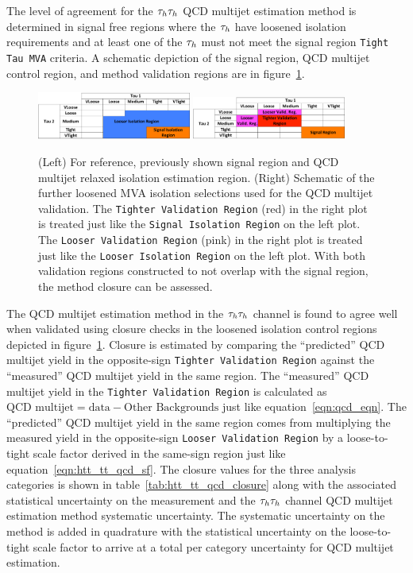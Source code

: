 The level of agreement for the $\tau_{h}\tau_{h}$ QCD multijet estimation method
is determined in signal free regions where the $\tau_{h}$ have loosened isolation requirements and at least
one of the $\tau_{h}$ must not meet the signal region \texttt{Tight Tau MVA} criteria. A schematic depiction
of the signal region, QCD multijet control region, and method validation regions are in 
figure~\ref{fig:htt_tautau_qcd_schematic2}.

\begin{figure}[htbp]
\centering
     \includegraphics[width=0.45\textwidth]{higgs_to_taus/plots/tautau_QCD_signal_region.pdf}
     \includegraphics[width=0.45\textwidth]{higgs_to_taus/plots/tautau_QCD_closureTestRegions.pdf}\\
     \caption{
(Left) For reference, previously shown signal region and QCD multijet relaxed isolation estimation region.
(Right) Schematic of the further loosened MVA isolation selections used for the QCD multijet validation.
The \texttt{Tighter Validation Region} (red) in the right plot is treated just like the \texttt{Signal Isolation Region}
on the left plot. The \texttt{Looser Validation Region} (pink) in the right plot is treated just like the 
\texttt{Looser Isolation Region} on the left plot. With both validation regions constructed to not overlap with the
signal region, the method closure can be assessed.
     }
     \label{fig:htt_tautau_qcd_schematic2}
\end{figure}

The QCD multijet estimation method in the $\tau_{h}\tau_{h}$ channel is found to agree well when validated using closure
checks in the loosened isolation control regions depicted in figure~\ref{fig:htt_tautau_qcd_schematic2}.
Closure is estimated by comparing the ``predicted'' QCD multijet yield in the opposite-sign
\texttt{Tighter Validation Region} against the ``measured'' QCD multijet yield in the same region. 
The ``measured'' QCD multijet yield in the \texttt{Tighter Validation Region} is calculated as 
$\text{QCD multijet} = \text{data} - \text{Other Backgrounds}$ just like equation~\ref{eqn:qcd_eqn}.
The ``predicted'' QCD multijet yield in the same region comes from multiplying the measured yield in the
opposite-sign \texttt{Looser Validation Region} by a loose-to-tight scale factor derived in the same-sign
region just like equation~\ref{eqn:htt_tt_qcd_sf}. The closure values for the three analysis categories
is shown in table~\ref{tab:htt_tt_qcd_closure} along with the associated statistical uncertainty on the
measurement and the $\tau_{h}\tau_{h}$ channel QCD multijet estimation method systematic uncertainty. The 
systematic uncertainty on the method is added in quadrature with the statistical uncertainty on the
loose-to-tight scale factor to arrive at a total per category uncertainty for QCD multijet estimation.

